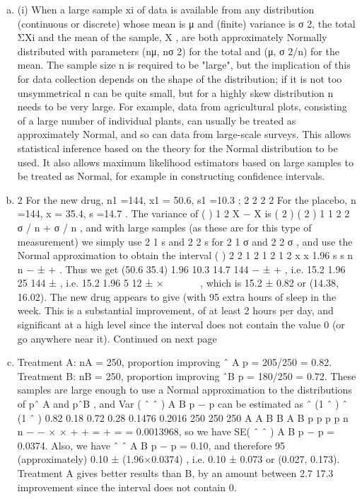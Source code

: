 \documentclass[a4paper,12pt]{article}
\begin{document}
\begin{enumerate}[(a)]
\item (i) When a large sample {xi} of data is available from any distribution
(continuous or discrete) whose mean is μ and (finite) variance is σ 2, the total
ΣXi and the mean of the sample, X , are both approximately Normally
distributed with parameters (nμ, nσ 2) for the total and (μ, σ 2/n) for the mean.
The sample size n is required to be "large", but the implication of this for data
collection depends on the shape of the distribution; if it is not too
unsymmetrical n can be quite small, but for a highly skew distribution n needs
to be very large.
For example, data from agricultural plots, consisting of a large number of
individual plants, can usually be treated as approximately Normal, and so can
data from large-scale surveys. This allows statistical inference based on the
theory for the Normal distribution to be used. It also allows maximum
likelihood estimators based on large samples to be treated as Normal, for
example in constructing confidence intervals.
\item  2
For the new drug, n1 =144, x1 = 50.6, s1 =10.3 ;
2
2 2 2 For the placebo, n =144, x = 35.4, s =14.7 .
The variance of ( ) 1 2 X − X is ( 2 ) ( 2 )
1 1 2 2 σ / n + σ / n , and with large samples (as
these are for this type of measurement) we simply use 2
1 s and 2
2 s for 2
1 σ and
2
2 σ , and use the Normal approximation to obtain the interval
( )
2 2
1 2
1 2
1 2
x x 1.96 s s
n n
− ± + .
Thus we get
(50.6 35.4) 1.96 10.3 14.7
144
− ± + ,
i.e. 15.2 1.96 25
144
± , i.e. 15.2 1.96 5
12
± ×   
 
,
which is 15.2 ± 0.82 or (14.38, 16.02).
The new drug appears to give (with 95%
extra hours of sleep in the week. This is a substantial improvement, of at least
2 hours per day, and significant at a high level since the interval does not
contain the value 0 (or go anywhere near it).
Continued on next page
\item  Treatment A: nA = 250, proportion improving ˆ A p = 205/250 = 0.82.
Treatment B: nB = 250, proportion improving ˆB p = 180/250 = 0.72.
These samples are large enough to use a Normal approximation to the
distributions of pˆ A and pˆB , and Var ( ˆ ˆ ) A B p − p can be estimated as
ˆ (1 ˆ ) ˆ (1 ˆ ) 0.82 0.18 0.72 0.28 0.1476 0.2016
250 250 250
A A B B
A B
p p p p
n n
− − × × + + = + =
= 0.0013968, so we have SE( ˆ ˆ ) A B p − p = 0.0374.
Also, we have ˆ ˆ A B p − p = 0.10, and therefore 95%
(approximately)
0.10 ± (1.96×0.0374) , i.e. 0.10 ± 0.073 or (0.027, 0.173).
Treatment A gives better results than B, by an amount between 2.7%
17.3%
improvement since the interval does not contain 0.

\end{enumerate}
\end{document}

